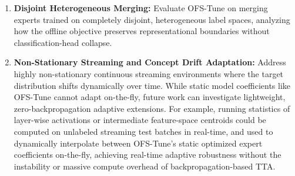 \documentclass{article}
\theoremstyle{plain}
\theoremstyle{definition}
\theoremstyle{remark}
\begin{document}
\begin{enumerate}[noitemsep,topsep=0pt]
\begin{itemize}[noitemsep,topsep=0pt]
    \end{itemize}
    \item \textbf{Disjoint Heterogeneous Merging:} Evaluate OFS-Tune on merging experts trained on completely disjoint, heterogeneous label spaces, analyzing how the offline objective preserves representational boundaries without classification-head collapse.
    \item \textbf{Non-Stationary Streaming and Concept Drift Adaptation:} Address highly non-stationary continuous streaming environments where the target distribution shifts dynamically over time. While static model coefficients like OFS-Tune cannot adapt on-the-fly, future work can investigate lightweight, zero-backpropagation adaptive extensions. For example, running statistics of layer-wise activations or intermediate feature-space centroids could be computed on unlabeled streaming test batches in real-time, and used to dynamically interpolate between OFS-Tune's static optimized expert coefficients on-the-fly, achieving real-time adaptive robustness without the instability or massive compute overhead of backpropagation-based TTA.
\end{enumerate}
\end{document}
